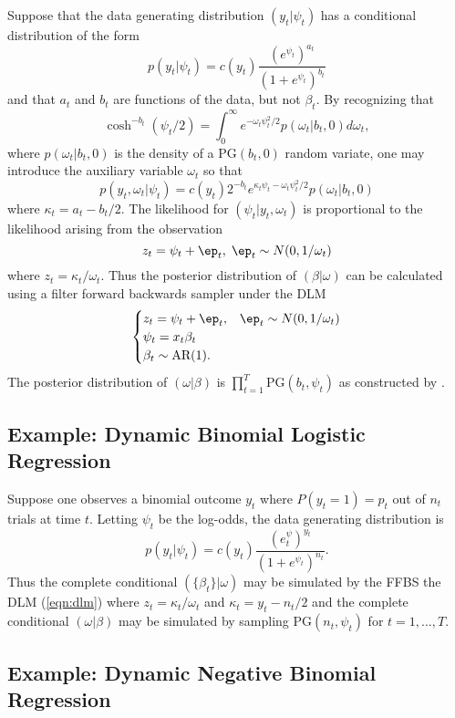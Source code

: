 \documentclass[11pt]{article}
\newcommand{\PG}{\text{PG}}
\begin{document}
Suppose that the data generating distribution $(y_t | \psi_t)$ has a conditional
distribution of the form
\[
p(y_t | \psi_t) = c(y_t) \frac{(e^{\psi_t})^{a_t}}{(1+e^{\psi_t})^{b_t}}
\]
and that $a_t$ and $b_t$ are functions of the data, but not $\beta_t$.  By
recognizing that
\[
\cosh^{-b_t}(\psi_t / 2) = \int_0^\infty e^{-\omega_t \psi_t^2 / 2} p(\omega_t |
b_t, 0) d \omega_t,
\]
where $p(\omega_t | b_t, 0)$ is the density of a $\PG(b_t, 0)$ random variate,
one may introduce the auxiliary variable $\omega_t$ so that
\[
p(y_t, \omega_t | \psi_t) = c(y_t) 2^{-b_t} e^{\kappa_t \psi_t -\omega_t
  \psi_t^2/2} p(\omega_t | b_t, 0)
\]
where $\kappa_t = a_t - b_t / 2$.  The likelihood for $(\psi_t | y_t, \omega_t)$
is proportional to the likelihood arising from the observation
\[
z_t = \psi_t + \ep_t, \; \ep_t \sim N(0, 1/\omega_t)
\]
where $z_t = \kappa_t / \omega_t$.  Thus the posterior distribution of $(\beta |
\omega)$ can be calculated using a filter forward backwards sampler under the
DLM
\begin{equation}
\label{eqn:dlm}
\begin{cases}
z_t = \psi_t + \ep_t, & \ep_t \sim N(0, 1/\omega_t) \\
\psi_t = x_t \beta_t \\
\beta_t \sim \text{AR}(1).
\end{cases}
\end{equation}
The posterior distribution of $(\omega | \beta)$ is $\prod_{t=1}^T \PG(b_t,
\psi_t)$ as constructed by \cite{polson-etal-2012}.

\subsection{Example: Dynamic Binomial Logistic Regression}

Suppose one observes a binomial outcome $y_t$ where $P(y_t = 1) = p_t$ out of
$n_t$ trials at time $t$.  Letting $\psi_t$ be the log-odds, the data generating
distribution is
\[
p(y_t | \psi_t) = c(y_t) \frac{(e^\psi_t)^{y_t}}{(1+e^{\psi_t})^{n_t}}.
\]
Thus the complete conditional $(\{\beta_t\} | \omega)$ may be simulated by the
FFBS the DLM (\ref{eqn:dlm}) where $z_t = \kappa_t / \omega_t$ and $\kappa_t =
y_t - n_t / 2$ and the complete conditional $(\omega | \beta)$ may be simulated
by sampling $\PG(n_t, \psi_t)$ for $t=1, \ldots, T$.


\subsection{Example: Dynamic Negative Binomial Regression}
\end{document}
